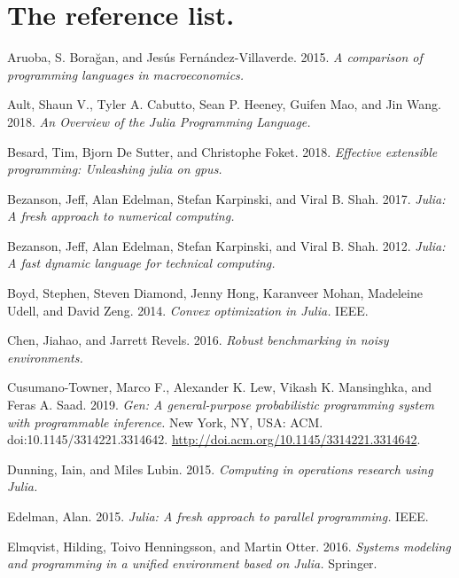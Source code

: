 \protect\hypertarget{refs}{}
\section{The reference list.}
\protect\hypertarget{ref-aruoba2015}{}Aruoba, S. Borağan, and Jesús Fernández-Villaverde. 2015. \textit{A comparison of programming languages in macroeconomics. }\par
\protect\hypertarget{ref-cabutto2018}{}Ault, Shaun V., Tyler A. Cabutto, Sean P. Heeney, Guifen Mao, and Jin Wang. 2018. \textit{An Overview of the Julia Programming Language. }\par
\protect\hypertarget{ref-besard2018}{}Besard, Tim, Bjorn De Sutter, and Christophe Foket. 2018. \textit{Effective extensible programming: Unleashing julia on gpus. }\par
\protect\hypertarget{ref-bezanson2017}{}Bezanson, Jeff, Alan Edelman, Stefan Karpinski, and Viral B. Shah. 2017. \textit{Julia: A fresh approach to numerical computing. }\par
\protect\hypertarget{ref-bezanson2012}{}Bezanson, Jeff, Alan Edelman, Stefan Karpinski, and Viral B. Shah. 2012. \textit{Julia: A fast dynamic language for technical computing. }\par
\protect\hypertarget{ref-udell2014}{}Boyd, Stephen, Steven Diamond, Jenny Hong, Karanveer Mohan, Madeleine Udell, and David Zeng. 2014. \textit{Convex optimization in Julia. }IEEE. \par
\protect\hypertarget{ref-chen2016}{}Chen, Jiahao, and Jarrett Revels. 2016. \textit{Robust benchmarking in noisy environments. }\par
\protect\hypertarget{ref-cusumano-towner2019}{}Cusumano-Towner, Marco F., Alexander K. Lew, Vikash K. Mansinghka, and Feras A. Saad. 2019. \textit{Gen: A general-purpose probabilistic programming system with programmable inference. }New York, NY, USA: ACM. doi:10.1145/3314221.3314642. \href{http://doi.acm.org/10.1145/3314221.3314642}{http://doi.acm.org/10.1145/3314221.3314642}. \par
\protect\hypertarget{ref-lubin2015}{}Dunning, Iain, and Miles Lubin. 2015. \textit{Computing in operations research using Julia. }\par
\protect\hypertarget{ref-edelman2015}{}Edelman, Alan. 2015. \textit{Julia: A fresh approach to parallel programming. }IEEE. \par
\protect\hypertarget{ref-elmqvist2016}{}Elmqvist, Hilding, Toivo Henningsson, and Martin Otter. 2016. \textit{Systems modeling and programming in a unified environment based on Julia. }Springer. \par
